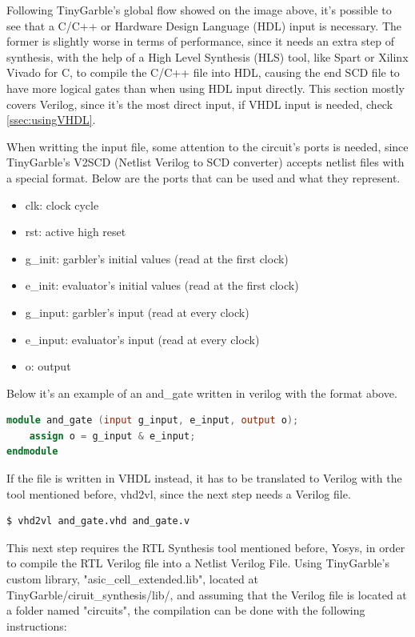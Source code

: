 \begin{refsection}
Following TinyGarble's global flow showed on the image above, it's possible to see that a C/C++ or Hardware Design Language (HDL) input is necessary. The former is slightly worse in terms of performance, since it needs an extra step of synthesis, with the help of a High Level Synthesis (HLS) tool, like Spart or Xilinx Vivado for C, to compile the C/C++ file into HDL, causing the end SCD file to have more logical gates than when using HDL input directly. This section mostly covers Verilog, since it's the most direct input, if VHDL input is needed, check \ref{ssec:usingVHDL}.

When writting the input file, some attention to the circuit's ports is needed, since TinyGarble's V2SCD (Netlist Verilog to SCD converter) accepts netlist files with a special format.
Below are the ports that can be used and what they represent.

\begin{itemize}
\item clk: clock cycle
\item rst: active high reset
\item g\_init: garbler's initial values (read at the first clock)
\item e\_init: evaluator's initial values (read at the first clock)
\item g\_input: garbler's input (read at every clock)
\item e\_input: evaluator's input (read at every clock)
\item o: output
\end{itemize}

Below it's an example of an and\_gate written in verilog with the format above.

\begin{lstlisting}[caption={and\_gate.v}, language=Verilog, captionpos=b]
module and_gate (input g_input, e_input, output o);
	assign o = g_input & e_input;
endmodule
\end{lstlisting}

If the file is written in VHDL instead, it has to be translated to Verilog with the tool mentioned before, vhd2vl, since the next step needs a Verilog file.

\begin{lstlisting}[caption={Translation of VHDL file into Verilog}, language=bash, captionpos=b]
$ vhd2vl and_gate.vhd and_gate.v	
\end{lstlisting}

This next step requires the RTL Synthesis tool mentioned before, Yosys, in order to compile the RTL Verilog file into a Netlist Verilog File.
Using TinyGarble's custom library, "asic\_cell\_extended.lib", located at TinyGarble/ciruit\_synthesis/lib/, and assuming that the Verilog file is located at a folder named "circuits", the compilation can be done with the following instructions:


\end{refsection}
